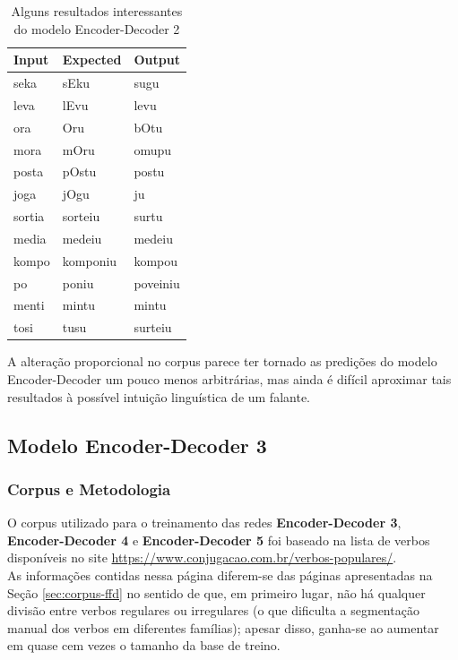 \begin{table}[H]
\centering
\begin{tabular}{lll}
\textbf{Input} & \textbf{Expected} & \textbf{Output} \\ \hline
seka& sEku& sugu \\
leva& lEvu& levu \\
ora& Oru& bOtu\\
mora& mOru& omupu\\
posta& pOstu& postu\\
joga& jOgu& ju\\
sortia& sorteiu& surtu\\
media& medeiu& medeiu\\
kompo& komponiu& kompou\\
po& poniu& poveiniu\\
menti& mintu& mintu\\
tosi& tusu& surteiu\\
\end{tabular}
\caption{Alguns resultados interessantes do modelo Encoder-Decoder 2}
\label{tab:res2}
\end{table}

A alteração proporcional no corpus parece ter tornado as predições do modelo Encoder-Decoder um pouco menos arbitrárias, mas ainda é difícil aproximar tais resultados à possível intuição linguística de um falante.  

\subsection{Modelo Encoder-Decoder 3}
 
\subsubsection{Corpus e Metodologia}

O corpus utilizado para o treinamento das redes \textbf{Encoder-Decoder 3}, \textbf{Encoder-Decoder 4} e \textbf{Encoder-Decoder 5}  foi baseado na lista de verbos disponíveis no site \url{https://www.conjugacao.com.br/verbos-populares/}.\\

As informações contidas nessa página diferem-se das páginas apresentadas na Seção \ref{sec:corpus-ffd} no sentido de que, em primeiro lugar, não há qualquer divisão entre verbos regulares ou irregulares (o que dificulta a segmentação manual dos verbos em diferentes famílias); apesar disso, ganha-se ao aumentar em quase cem vezes o tamanho da base de treino. 

